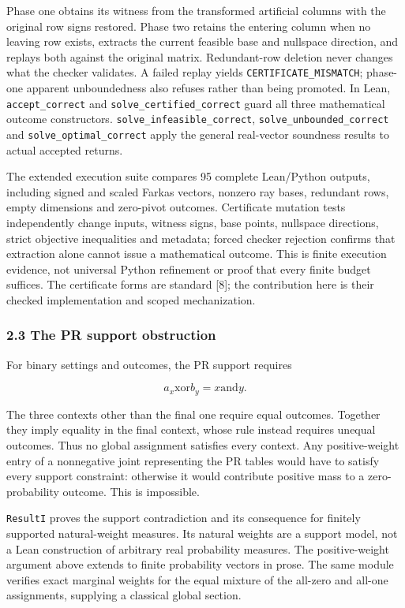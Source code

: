 \documentclass[
  10pt,
]{article}
\begin{document}
Phase one obtains its witness from the transformed artificial columns with the original row signs restored. Phase two retains the entering column when no leaving row exists, extracts the current feasible base and nullspace direction, and replays both against the original matrix. Redundant-row deletion never changes what the checker validates. A failed replay yields \texttt{CERTIFICATE\_MISMATCH}; phase-one apparent unboundedness also refuses rather than being promoted. In Lean, \texttt{accept\_correct} and \texttt{solve\_certified\_correct} guard all three mathematical outcome constructors. \texttt{solve\_infeasible\_correct}, \texttt{solve\_unbounded\_correct} and \texttt{solve\_optimal\_correct} apply the general real-vector soundness results to actual accepted returns.

The extended execution suite compares 95 complete Lean/Python outputs, including signed and scaled Farkas vectors, nonzero ray bases, redundant rows, empty dimensions and zero-pivot outcomes. Certificate mutation tests independently change inputs, witness signs, base points, nullspace directions, strict objective inequalities and metadata; forced checker rejection confirms that extraction alone cannot issue a mathematical outcome. This is finite execution evidence, not universal Python refinement or proof that every finite budget suffices. The certificate forms are standard {[}8{]}; the contribution here is their checked implementation and scoped mechanization.

\subsubsection{2.3 The PR support obstruction}\label{the-pr-support-obstruction}

For binary settings and outcomes, the PR support requires

\protect\hypertarget{math-E0011-0020}{}{\[
a_x\mathbin{\mathrm{xor}} b_y=x\mathbin{\mathrm{and}} y.
\]}

The three contexts other than the final one require equal outcomes. Together they imply equality in the final context, whose rule instead requires unequal outcomes. Thus no global assignment satisfies every context. Any positive-weight entry of a nonnegative joint representing the PR tables would have to satisfy every support constraint: otherwise it would contribute positive mass to a zero-probability outcome. This is impossible.

\texttt{ResultI} proves the support contradiction and its consequence for finitely supported natural-weight measures. Its natural weights are a support model, not a Lean construction of arbitrary real probability measures. The positive-weight argument above extends to finite probability vectors in prose. The same module verifies exact marginal weights for the equal mixture of the all-zero and all-one assignments, supplying a classical global section.
\end{document}
